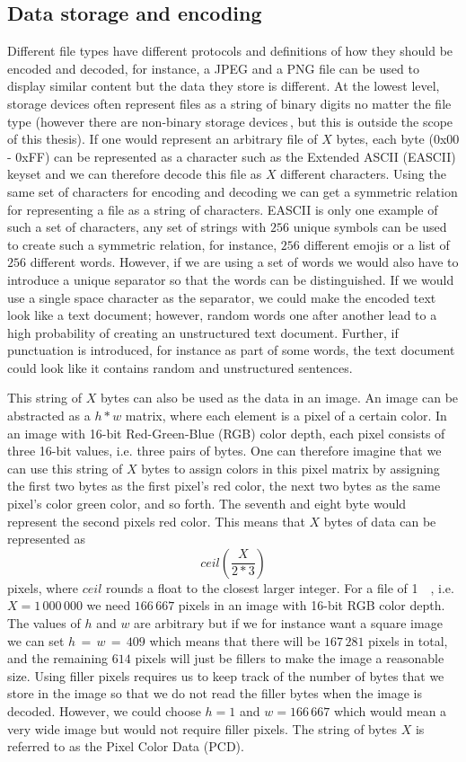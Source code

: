 \subsection{Data storage and encoding}
\label{sec:data_storage}
Different file types have different protocols and definitions of how they should be encoded and decoded, for instance, a JPEG and a PNG file can be used to display similar content but the data they store is different. At the lowest level, storage devices often represent files as a string of binary digits no matter the file type (however there are non-binary storage devices\,\cite{MultistateDataStorage2020}, but this is outside the scope of this thesis). If one would represent an arbitrary file of $X$ bytes, each byte (0x00 - 0xFF) can be represented as a character such as the Extended ASCII (\gls{EASCII}) keyset and we can therefore decode this file as $X$ different characters. Using the same set of characters for encoding and decoding we can get a symmetric relation for representing a file as a string of characters. EASCII is only one example of such a set of characters, any set of strings with $256$ unique symbols can be used to create such a symmetric relation, for instance, $256$ different emojis or a list of $256$ different words. However, if we are using a set of words we would also have to introduce a unique separator so that the words can be distinguished. If we would use a single space character as the separator, we could make the encoded text look like a text document; however, random words one after another lead to a high probability of creating an unstructured text document. Further, if punctuation is introduced, for instance as part of some words, the text document could look like it contains random and unstructured sentences.

This string of $X$ bytes can also be used as the data in an image. An image can be abstracted as a $h * w$ matrix, where each element is a pixel of a certain color. In an image with 16-bit Red-Green-Blue (\gls{RGB}) color depth, each pixel consists of three 16-bit values, i.e. three pairs of bytes. One can therefore imagine that we can use this string of $X$ bytes to assign colors in this pixel matrix by assigning the first two bytes as the first pixel's red color, the next two bytes as the same pixel's color green color, and so forth. The seventh and eight byte would represent the second pixels red color. This means that $X$ bytes of data can be represented as 
$$ceil(\frac{X}{2 * 3})$$ 
pixels, where $ceil$ rounds a float to the closest larger integer. For a file of \SI{1}{\mega\byte}, i.e. $X = 1\,000\,000$ we need $166\,667$ pixels in an image with 16-bit RGB color depth. The values of $h$ and $w$ are arbitrary but if we for instance want a square image we can set $ h\,=\,w\,=\,409$ which means that there will be $167\,281$ pixels in total, and the remaining $614$ pixels will just be fillers to make the image a reasonable size. Using filler pixels requires us to keep track of the number of bytes that we store in the image so that we do not read the filler bytes when the image is decoded. However, we could choose $h = 1$ and $w = 166\,667$ which would mean a very wide image but would not require filler pixels. The string of bytes $X$ is referred to as the Pixel Color Data (\gls{PCD}).

